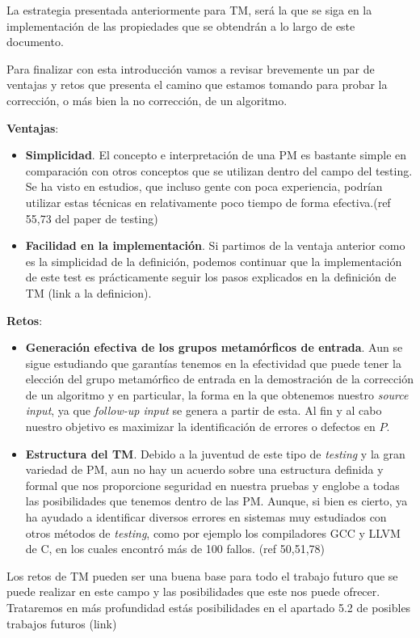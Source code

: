La estrategia presentada anteriormente para TM, será la que se siga en la implementación de las propiedades que se obtendrán a lo largo de este documento. \newline

Para finalizar con esta introducción vamos a revisar brevemente un par de ventajas y retos que presenta el camino que estamos tomando para probar la corrección, o más bien la no corrección, de un algoritmo. \newline

\textbf{Ventajas}:
\begin{itemize}
    \item \textbf{Simplicidad}. El concepto e interpretación de una PM es bastante simple en comparación con otros conceptos que se utilizan dentro del campo del testing. Se ha visto en estudios, que incluso gente con poca experiencia, podrían utilizar estas técnicas en relativamente poco tiempo de forma efectiva.(ref 55,73 del paper de testing)
    \item \textbf{Facilidad en la implementación}. Si partimos de la ventaja anterior como es la simplicidad de la definición, podemos continuar que la implementación de este test es prácticamente seguir los pasos explicados en la definición de TM (link a la definicion).
\end{itemize}

\vspace{10pt}

\textbf{Retos}:
\begin{itemize}
    \item \textbf{Generación efectiva de los grupos metamórficos de entrada}. Aun se sigue estudiando que garantías tenemos en la efectividad que puede tener la elección del grupo metamórfico de entrada en la demostración de la corrección de un algoritmo y en particular, la forma en la que obtenemos nuestro \textit{source input}, ya que \textit{follow-up input} se genera a partir de esta. Al fin y al cabo nuestro objetivo es maximizar la identificación de errores o defectos en $P$.
    
    \item \textbf{Estructura del TM}. Debido a la juventud de este tipo de \textit{testing} y la gran variedad de PM, aun no hay un acuerdo sobre una estructura definida y formal que nos proporcione seguridad en nuestra pruebas y englobe a todas las posibilidades que tenemos dentro de las PM. Aunque, si bien es cierto, ya ha ayudado a identificar diversos errores en sistemas muy estudiados con otros métodos de \textit{testing}, como por ejemplo los compiladores GCC y LLVM de C, en los cuales encontró más de 100 fallos. (ref 50,51,78)
\end{itemize}

Los retos de TM pueden ser una buena base para todo el trabajo futuro que se puede realizar en este campo y las posibilidades que este nos puede ofrecer. Trataremos en más profundidad estás posibilidades en el apartado 5.2 de posibles trabajos futuros (link)



